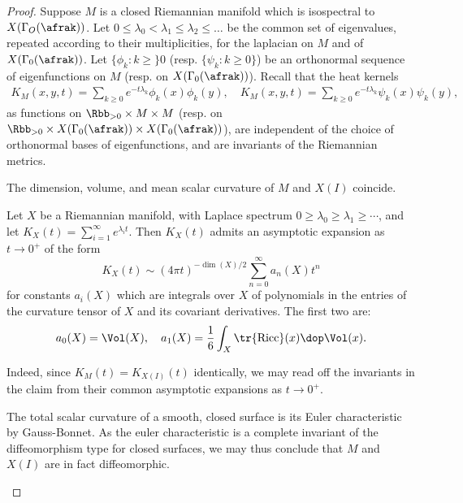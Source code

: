 \begin{proof}
  Suppose $M$ is a closed Riemannian manifold which is isospectral to $X(\Gamma_O(\afrak))$.
  Let $0 \leq \lambda_0 <\lambda_1 \leq \lambda_2 \leq \dots $ be the common set of eigenvalues, repeated according to their multiplicities, for the laplacian on $M$ and of $X(\Gamma_0(\afrak))$. Let $\{\phi_k: k\geq \}0$ (resp. $\{\psi_k: k\geq 0\}$) be an orthonormal sequence of eigenfunctions on $M$ (resp. on $X(\Gamma_0(\afrak))$). Recall that the heat kernels
  \begin{align}
    K_M (x,y,t) = \sum_{k\geq 0} e^{-t \lambda_k}\phi_k(x)\phi_k(y), \quad K_M(x,y,t) = \sum_{k\geq 0 } e^{-t \lambda_k} \psi_k(x) \psi_k(y),
  \end{align}
  as functions on $\Rbb_{>0} \times M\times M$  (resp. on $\Rbb_{>0}\times X(\Gamma_0(\afrak)) \times X(\Gamma_0(\afrak))$), are independent of the choice of orthonormal bases of eigenfunctions, and are invariants of the Riemannian metrics.




  \begin{claim}\label{claim:heat}
    The dimension, volume, and mean scalar curvature of $M$ and $X(I)$ coincide.
  \end{claim}



  \begin{lemma}
    Let $X$ be a Riemannian manifold, with Laplace spectrum $0\geq \lambda_0 \geq \lambda_1 \geq \cdots$, and let $K_X(t)=\sum_{i=1}^\infty e^{\lambda_i t}$. Then $K_X(t)$ admits an asymptotic expansion as $t\to 0^+$ of the form
    \[ K_X(t) \sim (4\pi t)^{-\dim(X)/2} \sum_{n=0}^\infty a_n(X) t^n \]
    for constants $a_i(X)$ which are integrals over $X$ of polynomials in the entries of the curvature tensor of $X$ and its covariant derivatives. The first two are:
    \[a_0(X) = \Vol(X),\quad a_1(X) = \frac{1}{6} \int_X \tr {\rm Ricc} (x) \dop \Vol(x).\]
  \end{lemma}

  Indeed, since $K_M(t) = K_{X(I)}(t)$ identically, we may read off the invariants in the claim from their common asymptotic expansions as $t\to 0^+$.
  \begin{rem}
    The total scalar curvature of a smooth, closed surface is its Euler characteristic by Gauss-Bonnet. As the euler characteristic is a complete invariant of the diffeomorphism type for closed surfaces, we may thus conclude that $M$ and $X(I)$ are in fact diffeomorphic.
  \end{rem}


\end{proof}
